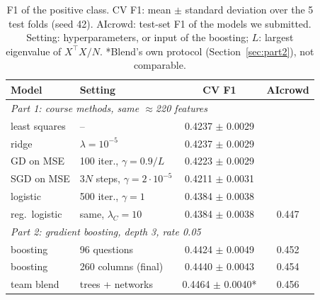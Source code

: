 \documentclass[10pt,conference,compsocconf]{IEEEtran}
\begin{document}
\begin{table}[tbp]
  \centering\footnotesize\setlength{\tabcolsep}{3pt}
  \begin{tabular}{|l|l|c|c|}
    \hline
    Model & Setting & CV F1 & AIcrowd \\
    \hline
    \multicolumn{4}{|l|}{\textit{Part 1: course methods, same $\approx$220
    features}} \\
    least squares & -- & 0.4237 $\pm$ 0.0029 & \\
    ridge & $\lambda=10^{-5}$ & 0.4237 $\pm$ 0.0029 & \\
    GD on MSE & 100 iter., $\gamma=0.9/L$ & 0.4223 $\pm$ 0.0029 & \\
    SGD on MSE & $3N$ steps, $\gamma=2\cdot10^{-5}$ & 0.4211 $\pm$ 0.0031 & \\
    logistic & 500 iter., $\gamma=1$ & 0.4384 $\pm$ 0.0038 & \\
    reg.\ logistic & same, $\lambda_C=10$ & 0.4384 $\pm$ 0.0038 & 0.447 \\
    \hline
    \multicolumn{4}{|l|}{\textit{Part 2: gradient boosting, depth 3, rate
    0.05}} \\
    boosting & 96 questions & 0.4424 $\pm$ 0.0049 & 0.452 \\
    boosting & 260 columns (final) & 0.4440 $\pm$ 0.0043 & 0.454 \\
    team blend & trees + networks & 0.4464 $\pm$ 0.0040* & 0.456 \\
    \hline
  \end{tabular}
  \caption{F1 of the positive class. CV F1: mean $\pm$ standard deviation over
    the 5 test folds (seed 42). AIcrowd: test-set F1 of the models we submitted.
    Setting: hyperparameters, or input of the boosting; $L$: largest eigenvalue
    of $X^\top X/N$. *Blend's own protocol
    (Section~\ref{sec:part2}), not comparable.}
  \label{tab:methods}
\end{table}
\end{document}
